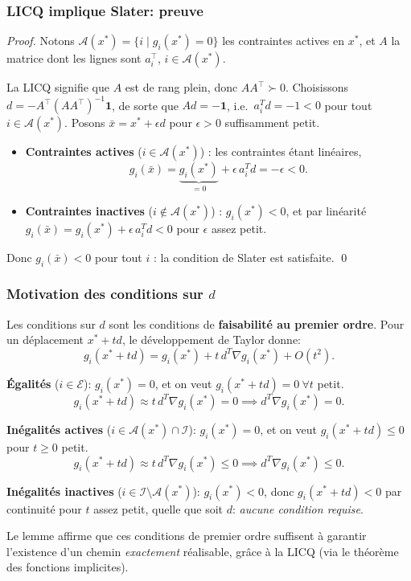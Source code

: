 \documentclass[usepdftitle=false,aspectratio=169]{beamer}
\def\cA{\mathcal{A}}
\def\cE{\mathcal{E}}
\def\cI{\mathcal{I}}
\begin{document}
\begin{frame}
\frametitle{LICQ implique Slater: preuve}

\begin{proof}
Notons $\cA(x^*) = \{i \mid g_i(x^*) = 0\}$ les contraintes actives en $x^*$, et $A$
la matrice dont les lignes sont $a_i^\top$, $i \in \cA(x^*)$.

\mbox{}

La LICQ signifie que $A$ est de rang plein, donc $AA^\top \succ 0$.
Choisissons $d = -A^\top(AA^\top)^{-1}\mathbf{1}$, de sorte que $Ad = -\mathbf{1}$,
i.e.\ $a_i^T d = -1 < 0$ pour tout $i \in \cA(x^*)$.
Posons $\bar{x} = x^* + \epsilon d$ pour $\epsilon > 0$ suffisamment petit.

\begin{itemize}
\item \textbf{Contraintes actives} ($i \in \cA(x^*)$) : les contraintes étant linéaires,
$$
g_i(\bar{x}) = \underbrace{g_i(x^*)}_{=0} + \epsilon\, a_i^T d = -\epsilon < 0.
$$
\item \textbf{Contraintes inactives} ($i \notin \cA(x^*)$) : $g_i(x^*) < 0$, et par
linéarité $g_i(\bar{x}) = g_i(x^*) + \epsilon\, a_i^T d < 0$ pour $\epsilon$ assez petit.
\end{itemize}

Donc $g_i(\bar{x}) < 0$ pour tout $i$ : la condition de Slater est satisfaite. \qed
\end{proof}

\end{frame}

\begin{frame}
\frametitle{Motivation des conditions sur $d$}

Les conditions sur $d$ sont les conditions de \textbf{faisabilité au premier ordre}.
Pour un déplacement $x^*+td$, le développement de Taylor donne:
$$
g_i(x^* + td) = g_i(x^*) + t\, d^T\nabla g_i(x^*) + O(t^2).
$$

\textbf{Égalités} ($i \in \cE$): $g_i(x^*)=0$, et on veut $g_i(x^*+td)=0\ \forall t$ petit.
$$
g_i(x^*+td) \approx t\,d^T\nabla g_i(x^*) = 0 \implies d^T\nabla g_i(x^*) = 0.
$$

\textbf{Inégalités actives} ($i \in \cA(x^*)\cap\cI$): $g_i(x^*)=0$, et on veut $g_i(x^*+td)\leq 0$ pour $t\geq 0$ petit.
$$
g_i(x^*+td) \approx t\,d^T\nabla g_i(x^*) \leq 0 \implies d^T\nabla g_i(x^*) \leq 0.
$$

\textbf{Inégalités inactives} ($i \in \cI\setminus\cA(x^*)$): $g_i(x^*)<0$, donc $g_i(x^*+td)<0$ par continuité pour $t$ assez petit, quelle que soit $d$: \emph{aucune condition requise}.

\medskip
Le lemme affirme que ces conditions de premier ordre suffisent à garantir l'existence d'un chemin \emph{exactement} réalisable, grâce à la LICQ (via le théorème des fonctions implicites).

\end{frame}
\end{document}

